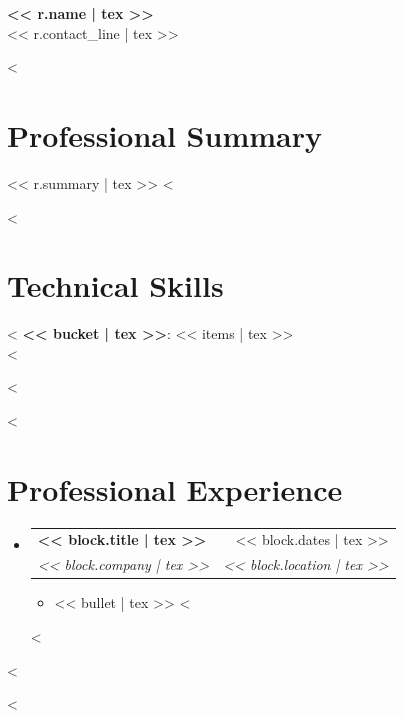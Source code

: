 \documentclass[letterpaper,10.5pt]{article}
\makeatletter
\newcommand{\resumeItem}[1]{\item\small{{#1 \vspace{-2pt}}}}
\newcommand{\resumeSubheading}[4]{
  \vspace{0pt}\item
    \begin{tabular*}{0.97\textwidth}[t]{l@{\extracolsep{\fill}}r}
      \textbf{#1} & #2 \\
      \textit{\small#3} & \textit{\small #4} \\
    \end{tabular*}\vspace{-7pt}
}
\makeatother
\begin{document}
\begin{center}
    {\Huge \textbf{\color{headingcolor}<< r.name | tex >>}} \\ \vspace{4pt}
    {\small << r.contact_line | tex >>}
\end{center}
\vspace{-6pt}

<%
\section{Professional Summary}
\vspace{1pt}
\small{<< r.summary | tex >>}
\vspace{-4pt}
<%

<%
\section{Technical Skills}
\vspace{1pt}
\begin{itemize}[leftmargin=0.15in, label={}]
    \small{\item{
<%
     \textbf{<< bucket | tex >>}{: << items | tex >>} \\
<%
    }}
\end{itemize}
\vspace{-8pt}
<%

<%
\section{Professional Experience}
  \begin{itemize}[leftmargin=0.15in, label={}]
<%
    \resumeSubheading
      {<< block.title | tex >>}{<< block.dates | tex >>}
      {<< block.company | tex >>}{<< block.location | tex >>}
      \begin{itemize}
<%
        \resumeItem{<< bullet | tex >>}
<%
      \end{itemize}\vspace{-5pt}
<%
  \end{itemize}
<%

<%
\end{document}
